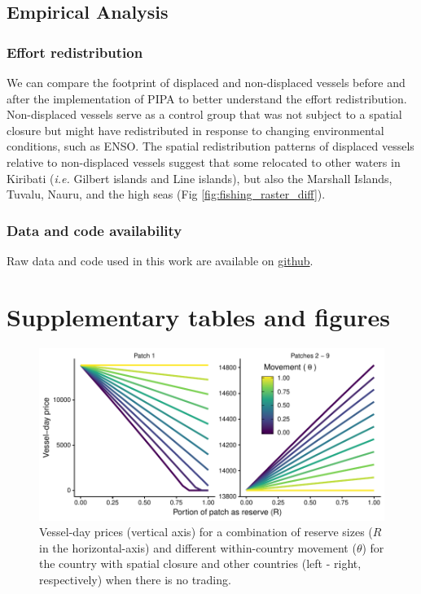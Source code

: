 \documentclass[12pt]{article}
\begin{document}
\subsection{Empirical Analysis}

\subsubsection{Effort redistribution}

We can compare the footprint of displaced and non-displaced vessels before and after the implementation of PIPA to better understand the effort redistribution. Non-displaced vessels serve as a control group that was not subject to a spatial closure but might have redistributed in response to changing environmental conditions, such as ENSO. The spatial redistribution patterns of displaced vessels relative to non-displaced vessels suggest that some relocated to other waters in Kiribati (\emph{i.e.} Gilbert islands and Line islands), but also the Marshall Islands, Tuvalu, Nauru, and the high seas (Fig \ref{fig:fishing_raster_diff}).

\subsubsection{Data and code availability}

Raw data and code used in this work are available on \href{https://github.com/jcvdav/MPA_displacement}{github}.

\clearpage

\FloatBarrier

\section{Supplementary tables and figures}

\begin{figure}[htbp]
\centering
\includegraphics{img/vessel_day_price_no_trading_plot.pdf}
\caption{\label{fig:vessel_day_price_no_trading_plot}Vessel-day prices (vertical axis) for a combination of reserve sizes ($R$ in the horizontal-axis) and different within-country movement ($\theta$) for the country with spatial closure and other countries (left - right, respectively) when there is no trading.}
\end{figure}
\end{document}
